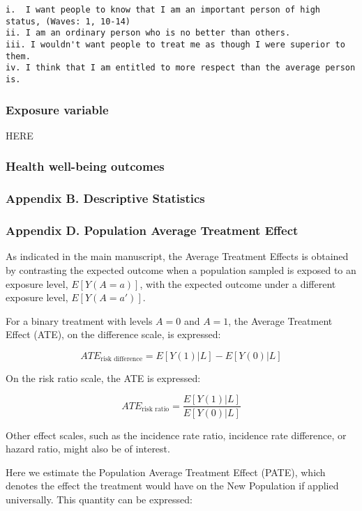 \documentclass[
  singlecolumn]{article}
\begin{document}
\begin{verbatim}
i.  I want people to know that I am an important person of high status, (Waves: 1, 10-14)
ii. I am an ordinary person who is no better than others.
iii. I wouldn't want people to treat me as though I were superior to them.
iv. I think that I am entitled to more respect than the average person is.
\end{verbatim}

\subsubsection{Exposure variable}\label{exposure-variable}

HERE

\subsubsection{Health well-being
outcomes}\label{health-well-being-outcomes}

\subsubsection{Appendix B. Descriptive
Statistics}\label{appendix-b.-descriptive-statistics}

\subsubsection{Appendix D. Population Average Treatment
Effect}\label{appendix-d.-population-average-treatment-effect}

As indicated in the main manuscript, the Average Treatment Effects is
obtained by contrasting the expected outcome when a population sampled
is exposed to an exposure level, \(E[Y(A = a)]\), with the expected
outcome under a different exposure level, \(E[Y(A=a')]\).

For a binary treatment with levels \(A=0\) and \(A=1\), the Average
Treatment Effect (ATE), on the difference scale, is expressed:

\[ATE_{\text{risk difference}} = E[Y(1)|L] - E[Y(0)|L]\]

On the risk ratio scale, the ATE is expressed:

\[ATE_{\text{risk ratio}} = \frac{E[Y(1)|L]}{E[Y(0)|L]}\]

Other effect scales, such as the incidence rate ratio, incidence rate
difference, or hazard ratio, might also be of interest.

Here we estimate the Population Average Treatment Effect (PATE), which
denotes the effect the treatment would have on the New Population if
applied universally. This quantity can be expressed:
\end{document}
